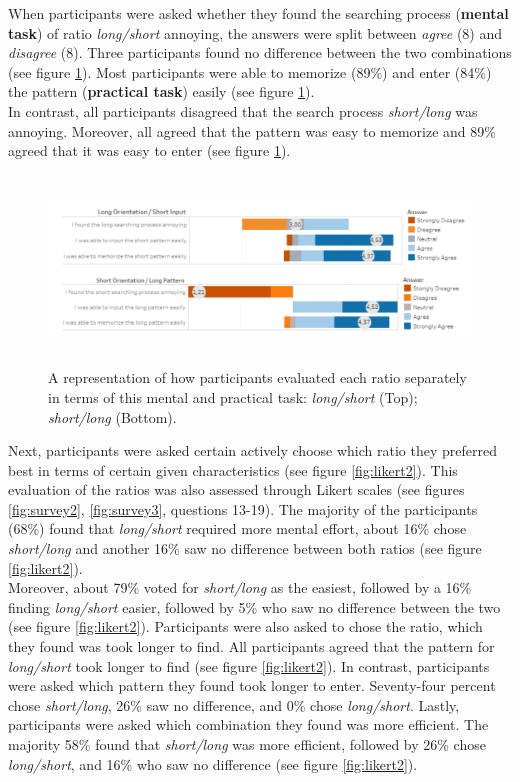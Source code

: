 When participants were asked whether they found the searching process (\textbf{mental task}) of ratio \textit{long/short} annoying, the answers were split between \textit{agree} (8) and \textit{disagree} (8). Three participants found no difference between the two combinations (see figure \ref{fig:likert}). Most participants were able to memorize (89\%) and enter (84\%) the pattern (\textbf{practical task}) easily (see figure \ref{fig:likert}). \\
In contrast, all participants disagreed that the search process \textit{short/long} was annoying. Moreover, all agreed that the pattern was easy to memorize and 89\% agreed that it was easy to enter (see figure \ref{fig:likert}).\\
 
 \begin{figure}[t!]
\centering
\includegraphics[width=15cm, height=5cm]{Chapters/graphics/Likert1213.PNG}
\caption{A representation of how participants evaluated each ratio separately in terms of this mental and practical task: \textit{long/short} (Top); \textit{short/long} (Bottom).  }
\label{fig:likert}
\end{figure}

Next, participants were asked certain actively choose which ratio they preferred best in terms of certain given characteristics (see figure \ref{fig:likert2}). This evaluation of the ratios was also assessed through Likert scales (see figures \ref{fig:survey2}, \ref{fig:survey3}, questions 13-19). The majority of the participants (68\%) found that \textit{long/short} required more mental effort, about 16\% chose \textit{short/long} and another 16\% saw no difference between both ratios (see figure \ref{fig:likert2}). \\
Moreover, about 79\% voted for \textit{short/long} as the easiest, followed by a 16\% finding \textit{long/short} easier, followed by 5\% who saw no difference between the two (see figure \ref{fig:likert2}). Participants were also asked to chose the ratio, which they found was took longer to find. All participants agreed that the pattern for \textit{long/short} took longer to find (see figure \ref{fig:likert2}). In contrast, participants were asked which pattern they found took longer to enter. Seventy-four percent chose \textit{short/long}, 26\% saw no difference, and 0\% chose \textit{long/short}. Lastly, participants were asked which combination they found was more efficient. The majority 58\% found that \textit{short/long} was more efficient, followed by 26\% chose \textit{long/short}, and 16\% who saw no difference (see figure \ref{fig:likert2}). \\

